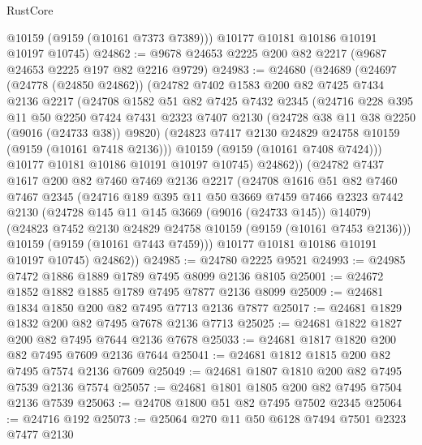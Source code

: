 \begin{lexlean}{RustCore}
\begin{coremodule}
        @10159
        (@9159 (@10161 @7373 @7389)))
      @10177
      @10181
      @10186
      @10191
      @10197
      @10745)
@24862 := @9678 @24653 @2225 @200 @82 @2217 (@9687 @24653 @2225 @197 @82 @2216 @9729)
@24983 := @24680
    (@24689
      (@24697
        (@24778 (@24850 @24862))
        (@24782
          @7402
          @1583
          @200
          @82
          @7425
          @7434
          @2136
          @2217
          (@24708
            @1582
            @51
            @82
            @7425
            @7432
            @2345
            (@24716
              @228
              @395
              @11
              @50
              @2250
              @7424
              @7431
              @2323
              @7407
              @2130
              (@24728 @38 @11 @38 @2250 (@9016 (@24733 @38)) @9820)
              (@24823 @7417 @2130 @24829 @24758 @10159 (@9159 (@10161 @7418 @2136)))
              @10159
              (@9159 (@10161 @7408 @7424)))
            @10177
            @10181
            @10186
            @10191
            @10197
            @10745)
          @24862))
      (@24782
        @7437
        @1617
        @200
        @82
        @7460
        @7469
        @2136
        @2217
        (@24708
          @1616
          @51
          @82
          @7460
          @7467
          @2345
          (@24716
            @189
            @395
            @11
            @50
            @3669
            @7459
            @7466
            @2323
            @7442
            @2130
            (@24728 @145 @11 @145 @3669 (@9016 (@24733 @145)) @14079)
            (@24823 @7452 @2130 @24829 @24758 @10159 (@9159 (@10161 @7453 @2136)))
            @10159
            (@9159 (@10161 @7443 @7459)))
          @10177
          @10181
          @10186
          @10191
          @10197
          @10745)
        @24862))
@24985 := @24780 @2225 @9521
@24993 := @24985 @7472 @1886 @1889 @1789 @7495 @8099 @2136 @8105
@25001 := @24672 @1852 @1882 @1885 @1789 @7495 @7877 @2136 @8099
@25009 := @24681 @1834 @1850 @200 @82 @7495 @7713 @2136 @7877
@25017 := @24681 @1829 @1832 @200 @82 @7495 @7678 @2136 @7713
@25025 := @24681 @1822 @1827 @200 @82 @7495 @7644 @2136 @7678
@25033 := @24681 @1817 @1820 @200 @82 @7495 @7609 @2136 @7644
@25041 := @24681 @1812 @1815 @200 @82 @7495 @7574 @2136 @7609
@25049 := @24681 @1807 @1810 @200 @82 @7495 @7539 @2136 @7574
@25057 := @24681 @1801 @1805 @200 @82 @7495 @7504 @2136 @7539
@25063 := @24708 @1800 @51 @82 @7495 @7502 @2345
@25064 := @24716 @192
@25073 := @25064 @270 @11 @50 @6128 @7494 @7501 @2323 @7477 @2130

\end{coremodule}
\end{lexlean}
